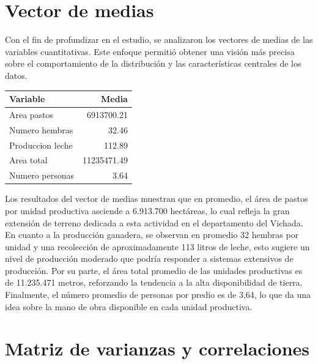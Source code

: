 \documentclass[]{tufte-handout}
\begin{document}
\section{Vector de medias}\label{vector-de-medias}

\begin{justify}
Con el fin de profundizar en el estudio, se analizaron los vectores de medias de las variables cuantitativas. Este enfoque permitió obtener una visión más precisa sobre el comportamiento de la distribución y las características centrales de los datos.

\begin{marginfigure}
 
\begin{tabular}{lr}
\toprule
Variable & Media\\
\midrule
Area pastos & 6913700.21\\
Numero hembras & 32.46\\
Produccion leche & 112.89\\
Area total & 11235471.49\\
Numero personas & 3.64\\
\bottomrule
\end{tabular} 
\end{marginfigure}
\vspace{0.2 cm}
Los resultados del vector de medias muestran que en promedio, el área de pastos por unidad productiva asciende a 6.913.700 hectáreas, lo cual refleja la gran extensión de terreno dedicada a esta actividad en el departamento del Vichada. En cuanto a la producción ganadera, se observan en promedio 32 hembras por unidad y una recolección de aproximadamente 113 litros de leche, esto sugiere un nivel de producción moderado que podría responder a sistemas extensivos de producción. Por su parte, el área total promedio de las unidades productivas es de 11.235.471 metros, reforzando la tendencia a la alta disponibilidad de tierra. Finalmente, el número promedio de personas por predio es de 3,64, lo que da una idea sobre la mano de obra disponible en cada unidad productiva.
\end{justify}

\section{Matriz de varianzas y
correlaciones}\label{matriz-de-varianzas-y-correlaciones}
\end{document}
